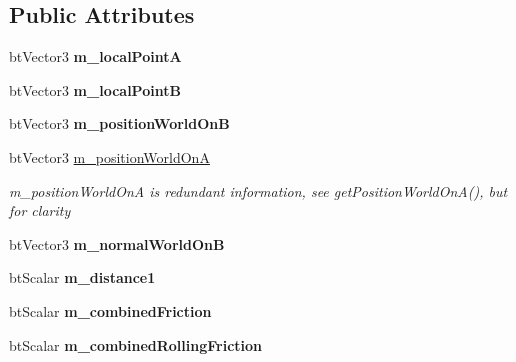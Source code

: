 \subsection*{Public Attributes}
\begin{DoxyCompactItemize}
\item 
\mbox{\label{classbtManifoldPoint_a58a8028c5de712ff0224cfde8c9e8e44}} 
bt\+Vector3 {\bfseries m\+\_\+local\+PointA}
\item 
\mbox{\label{classbtManifoldPoint_a6df421e6b6345cacee6b1bdd6307fe6b}} 
bt\+Vector3 {\bfseries m\+\_\+local\+PointB}
\item 
\mbox{\label{classbtManifoldPoint_ae64702f66baa6539b56dd1f7d2f163e0}} 
bt\+Vector3 {\bfseries m\+\_\+position\+World\+OnB}
\item 
\mbox{\label{classbtManifoldPoint_a5fd89785a2e081dd658b15af8bedf04b}} 
bt\+Vector3 \hyperlink{classbtManifoldPoint_a5fd89785a2e081dd658b15af8bedf04b}{m\+\_\+position\+World\+OnA}
\begin{DoxyCompactList}\small\item\em m\+\_\+position\+World\+OnA is redundant information, see get\+Position\+World\+On\+A(), but for clarity \end{DoxyCompactList}\item 
\mbox{\label{classbtManifoldPoint_ac821b226c09cd4f50009645fa932161e}} 
bt\+Vector3 {\bfseries m\+\_\+normal\+World\+OnB}
\item 
\mbox{\label{classbtManifoldPoint_a8a42d00697733931ef82220feca0f401}} 
bt\+Scalar {\bfseries m\+\_\+distance1}
\item 
\mbox{\label{classbtManifoldPoint_ad4ac2c484c62af1142d2aea1a3e67777}} 
bt\+Scalar {\bfseries m\+\_\+combined\+Friction}
\item 
\mbox{\label{classbtManifoldPoint_a3e25a81eaabb31cb5caf1510da3b7946}} 
bt\+Scalar {\bfseries m\+\_\+combined\+Rolling\+Friction}
\item 
\mbox{\label{classbtManifoldPoint_a566013cf11150ea0f268c7561eace4fd}} 

\end{DoxyCompactItemize}
